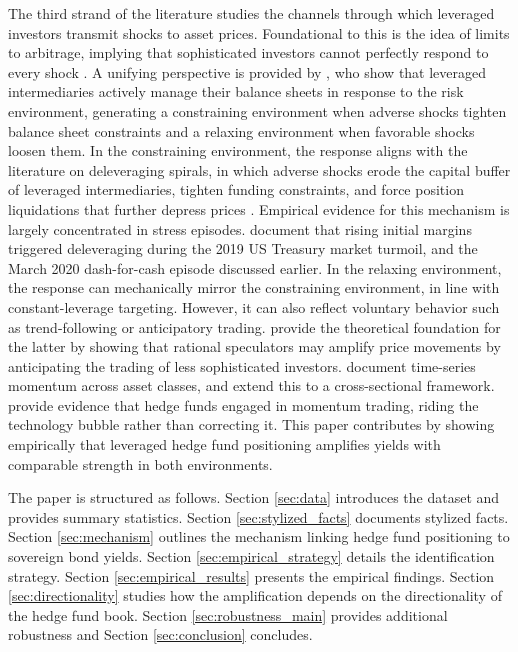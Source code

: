 \documentclass[english, 11pt, oneside]{article}
\begin{document}
The third strand of the literature studies the channels through which leveraged investors transmit shocks to asset prices. Foundational to this is the idea of limits to arbitrage, implying that sophisticated investors cannot perfectly respond to every shock \citep{shleifer1997, gromb2002}. A unifying perspective is provided by \citet{adrian2014}, who show that leveraged intermediaries actively manage their balance sheets in response to the risk environment, generating a constraining environment when adverse shocks tighten balance sheet constraints and a relaxing environment when favorable shocks loosen them. In the constraining environment, the response aligns with the literature on deleveraging spirals, in which adverse shocks erode the capital buffer of leveraged intermediaries, tighten funding constraints, and force position liquidations that further depress prices \citep{brunnermeier2009, geanakoplos2010, adrian2010}. Empirical evidence for this mechanism is largely concentrated in stress episodes. \citet{avalos2023} document that rising initial margins triggered deleveraging during the 2019 US Treasury market turmoil, and the March 2020 dash-for-cash episode discussed earlier. In the relaxing environment, the response can mechanically mirror the constraining environment, in line with constant-leverage targeting. However, it can also reflect voluntary behavior such as trend-following or anticipatory trading. \citet{deLong1990} provide the theoretical foundation for the latter by showing that rational speculators may amplify price movements by anticipating the trading of less sophisticated investors. \citet{moskowitz2012} document time-series momentum across asset classes, and \citet{asness2013} extend this to a cross-sectional framework. \citet{brunnermeier2004} provide evidence that hedge funds engaged in momentum trading, riding the technology bubble rather than correcting it. This paper contributes by showing empirically that leveraged hedge fund positioning amplifies yields with comparable strength in both environments.







\vspace{1em}\noindent
The paper is structured as follows. Section \ref{sec:data} introduces the dataset and provides summary statistics. Section \ref{sec:stylized_facts} documents stylized facts. Section \ref{sec:mechanism} outlines the mechanism linking hedge fund positioning to sovereign bond yields. Section \ref{sec:empirical_strategy} details the identification strategy. Section \ref{sec:empirical_results} presents the empirical findings. Section \ref{sec:directionality} studies how the amplification depends on the directionality of the hedge fund book. Section \ref{sec:robustness_main} provides additional robustness and Section \ref{sec:conclusion} concludes.
\end{document}

